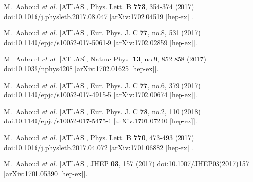 \begin{thebibliography}{9}
M.~Aaboud \textit{et al.} [ATLAS],
Phys. Lett. B \textbf{773}, 354-374 (2017)
doi:10.1016/j.physletb.2017.08.047
[arXiv:1702.04519 [hep-ex]].

M.~Aaboud \textit{et al.} [ATLAS],
Eur. Phys. J. C \textbf{77}, no.8, 531 (2017)
doi:10.1140/epjc/s10052-017-5061-9
[arXiv:1702.02859 [hep-ex]].

M.~Aaboud \textit{et al.} [ATLAS],
Nature Phys. \textbf{13}, no.9, 852-858 (2017)
doi:10.1038/nphys4208
[arXiv:1702.01625 [hep-ex]].

M.~Aaboud \textit{et al.} [ATLAS],
Eur. Phys. J. C \textbf{77}, no.6, 379 (2017)
doi:10.1140/epjc/s10052-017-4915-5
[arXiv:1702.00674 [hep-ex]].

M.~Aaboud \textit{et al.} [ATLAS],
Eur. Phys. J. C \textbf{78}, no.2, 110 (2018)
doi:10.1140/epjc/s10052-017-5475-4
[arXiv:1701.07240 [hep-ex]].

M.~Aaboud \textit{et al.} [ATLAS],
Phys. Lett. B \textbf{770}, 473-493 (2017)
doi:10.1016/j.physletb.2017.04.072
[arXiv:1701.06882 [hep-ex]].

M.~Aaboud \textit{et al.} [ATLAS],
JHEP \textbf{03}, 157 (2017)
doi:10.1007/JHEP03(2017)157
[arXiv:1701.05390 [hep-ex]].


\end{thebibliography}
